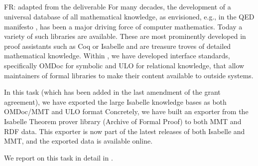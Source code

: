\subparagraph{}
\begin{newpart}{FR: adapted from the deliverable}
For many decades, the development of a universal database of all mathematical knowledge, as envisioned, e.g., in the QED manifesto \cite{qed}, has been a major driving force of computer mathematics.
Today a variety of such libraries are available.
These are most prominently developed in proof assistants such as Coq \cite{coq} or Isabelle \cite{isabelle} and are treasure troves of detailed mathematical knowledge.
Within \pn, we have developed interface standards, specifically OMDoc for symbolic and ULO for relational knowledge, that allow maintainers of formal libraries to make their content available to outside systems.

In this task (which has been added in the last amendment of the grant agreement), we have exported the large Isabelle knowledge bases as both OMDoc/MMT and ULO format
Concretely, we have built an exporter from the Isabelle Theorem prover library (Archive of Formal Proof) to both MMT and RDF data.
This exporter is now part of the latest releases of both Isabelle and MMT, and the exported data is available online.

We report on this task in detail in .
\end{newpart}



